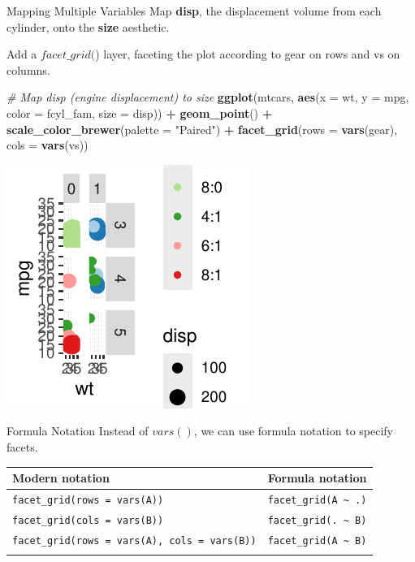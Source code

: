 \documentclass[
  ignorenonframetext,
]{beamer}
\newenvironment{Shaded}{\begin{snugshade}}{\end{snugshade}}
\newcommand{\AttributeTok}[1]{\textcolor[rgb]{0.13,0.29,0.53}{#1}}
\newcommand{\CommentTok}[1]{\textcolor[rgb]{0.56,0.35,0.01}{\textit{#1}}}
\newcommand{\FunctionTok}[1]{\textcolor[rgb]{0.13,0.29,0.53}{\textbf{#1}}}
\newcommand{\NormalTok}[1]{#1}
\newcommand{\SpecialCharTok}[1]{\textcolor[rgb]{0.81,0.36,0.00}{\textbf{#1}}}
\newcommand{\StringTok}[1]{\textcolor[rgb]{0.31,0.60,0.02}{#1}}
\begin{document}
\begin{frame}[fragile]{Mapping Multiple Variables}
\label{mapping-multiple-variables-2}
Map \textbf{disp}, the displacement volume from each cylinder, onto the
\textbf{size} aesthetic.

Add a \(facet\_grid(\)) layer, faceting the plot according to gear on
rows and vs on columns.


\begin{Shaded}
\begin{Highlighting}[]
\CommentTok{\# Map disp (engine displacement) to size}
\FunctionTok{ggplot}\NormalTok{(mtcars, }\FunctionTok{aes}\NormalTok{(}\AttributeTok{x =}\NormalTok{ wt, }\AttributeTok{y =}\NormalTok{ mpg, }\AttributeTok{color =}\NormalTok{ fcyl\_fam, }\AttributeTok{size =}\NormalTok{ disp)) }\SpecialCharTok{+}
    \FunctionTok{geom\_point}\NormalTok{() }\SpecialCharTok{+} \FunctionTok{scale\_color\_brewer}\NormalTok{(}\AttributeTok{palette =} \StringTok{"Paired"}\NormalTok{) }\SpecialCharTok{+} \FunctionTok{facet\_grid}\NormalTok{(}\AttributeTok{rows =} \FunctionTok{vars}\NormalTok{(gear),}
    \AttributeTok{cols =} \FunctionTok{vars}\NormalTok{(vs))}
\end{Highlighting}
\end{Shaded}

\begin{center}\includegraphics[width=0.5\linewidth]{Figs/unnamed-chunk-78-1} \end{center}
\end{frame}

\begin{frame}[fragile]{Formula Notation}
\label{formula-notation}
Instead of \(vars()\), we can use formula notation to specify facets.

\begin{longtable}[]{@{}ll@{}}
\toprule\noalign{}
Modern notation & Formula notation \\
\midrule\noalign{}
\endhead
\texttt{facet\_grid(rows\ =\ vars(A))} &
\texttt{facet\_grid(A\ \textasciitilde{}\ .)} \\
\texttt{facet\_grid(cols\ =\ vars(B))} &
\texttt{facet\_grid(.\ \textasciitilde{}\ B)} \\
\texttt{facet\_grid(rows\ =\ vars(A),\ cols\ =\ vars(B))} &
\texttt{facet\_grid(A\ \textasciitilde{}\ B)} \\
\bottomrule\noalign{}
\end{longtable}
\end{frame}
\end{document}
